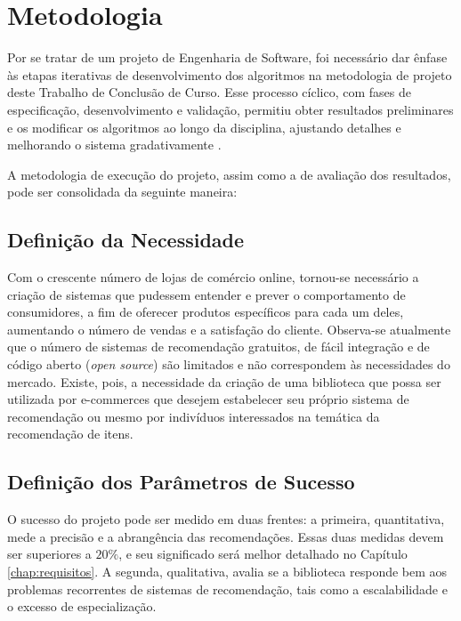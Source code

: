 \chapter[Metodologia]{Metodologia}
\label{chap:metodologia}

Por se tratar de um projeto de Engenharia de Software, foi necessário dar ênfase às etapas iterativas de desenvolvimento dos algoritmos na metodologia de projeto deste Trabalho de Conclusão de Curso. Esse processo cíclico, com fases de especificação, desenvolvimento e validação, permitiu obter resultados preliminares e os modificar os algoritmos ao longo da disciplina, ajustando detalhes e melhorando o sistema gradativamente \cite{iterative-development}.

A metodologia de execução do projeto, assim como a de avaliação dos resultados, pode ser consolidada da seguinte maneira: 

\section{Definição da Necessidade} %
\label{sec:defini_o_da_necessidade}


Com o crescente número de lojas de comércio online, tornou-se necessário a criação de sistemas que pudessem entender e prever o comportamento de consumidores, a fim de oferecer produtos específicos para cada um deles, aumentando o número de vendas e a satisfação do cliente. Observa-se atualmente que o número de sistemas de recomendação gratuitos, de fácil integração e de código aberto (\textit{open source}) são limitados e não correspondem às necessidades do mercado. Existe, pois, a necessidade da criação de uma biblioteca que possa ser utilizada por e-commerces que desejem estabelecer seu próprio sistema de recomendação ou mesmo por indivíduos interessados na temática da recomendação de itens.

\section{Definição dos Parâmetros de Sucesso} %
\label{sec:defini_o_dos_par_metros_de_sucesso}


O sucesso do projeto pode ser medido em duas frentes: a primeira, quantitativa, mede a precisão e a abrangência das recomendações. Essas duas medidas devem ser superiores a $20\%$, e seu significado será melhor detalhado no Capítulo \ref{chap:requisitos}.  A segunda, qualitativa, avalia se a biblioteca responde bem aos problemas recorrentes de sistemas de recomendação, tais como a escalabilidade e o excesso de especialização.  

